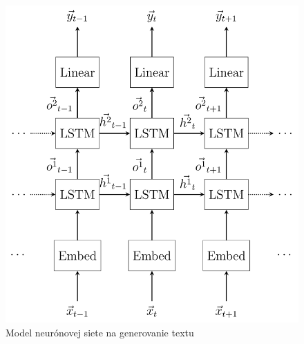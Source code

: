 	
		
			
	


\begin{figure}[H]
\begin{center}
\includegraphics[width=1.0\linewidth]{figures/model-1.png}
\caption{Model neurónovej siete na generovanie textu}
\label{fig:nn_model}
\end{center}
\end{figure}

